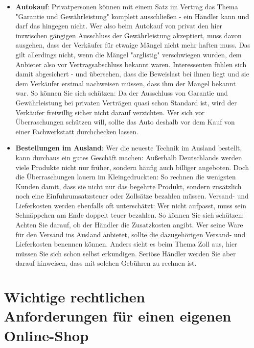 \documentclass[a4paper]{article}
\begin{document}
\begin{itemize}
\item \textbf{Autokauf}: Privatpersonen können mit einem Satz im Vertrag das Thema "Garantie und Gewährleistung" komplett ausschließen - ein Händler kann und darf das hingegen nicht. Wer also beim Autokauf von privat den hier inzwischen gängigen Ausschluss der Gewährleistung akzeptiert, muss davon ausgehen, dass der Verkäufer für etwaige Mängel nicht mehr haften muss. Das gilt allerdings nicht, wenn die Mängel "arglistig" verschwiegen wurden, dem Anbieter also vor Vertragsabschluss bekannt waren. Interessenten fühlen sich damit abgesichert - und übersehen, dass die Beweislast bei ihnen liegt und sie dem Verkäufer erstmal nachweisen müssen, dass ihm der Mangel bekannt war. So können Sie sich schützen: Da der Ausschluss von Garantie und Gewährleistung bei privaten Verträgen quasi schon Standard ist, wird der Verkäufer freiwillig sicher nicht darauf verzichten. Wer sich vor Überraschungen schützen will, sollte das Auto deshalb vor dem Kauf von einer Fachwerkstatt durchchecken lassen.

\item \textbf{Bestellungen im Ausland}: Wer die neueste Technik im Ausland bestellt, kann durchaus ein gutes Geschäft machen: Außerhalb Deutschlands werden viele Produkte nicht nur früher, sondern häufig auch billiger angeboten. Doch die Überraschungen lauern im Kleingedruckten: So rechnen die wenigsten Kunden damit, dass sie nicht nur das begehrte Produkt, sondern zusätzlich noch eine Einfuhrumsatzsteuer oder Zollsätze bezahlen müssen. Versand- und Lieferkosten werden ebenfalls oft unterschätzt: Wer nicht aufpasst, muss sein Schnäppchen am Ende doppelt teuer bezahlen. So können Sie sich schützen: Achten Sie darauf, ob der Händler die Zusatzkosten angibt. Wer seine Ware für den Versand ins Ausland anbietet, sollte die dazugehörigen Versand- und Lieferkosten benennen können. Anders sieht es beim Thema Zoll aus, hier müssen Sie sich schon selbst erkundigen. Seriöse Händler werden Sie aber darauf hinweisen, dass mit solchen Gebühren zu rechnen ist.

\end{itemize}

\newpage
\section{Wichtige rechtlichen Anforderungen für einen eigenen Online-Shop}
\end{document}
